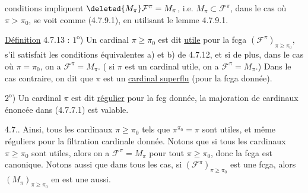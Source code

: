 conditions impliquent $\deleted{M_\pi}\mathcal F^\pi=M_\pi$, i.e. $M_\pi\subset\mathcal F^\pi$,
dans le cas où $\pi>\pi_0$, se voit comme (4.7.9.1),
en utilisant le lemme 4.7.9.1.

\uline{Définition} 4.7.13 : $1^{\mathrm{o}}$) Un cardinal $\pi\geq\pi_0$ est
dit  \uline{utile} pour la fcga $(\mathcal F^\pi)_{\pi\geq\pi_0}$, 
s'il satisfait les conditions équivalentes
a) et b) de 4.7.12, et si de plus, dans
le cas où $\pi=\pi_0$, on a  $\mathcal F^\pi=M_\pi$. (
si $\pi$ est un cardinal utile, on a   $\mathcal F^\pi=M_\pi$.)
Dans le cas contraire, on dit que $\pi$ est
un \uline{cardinal superflu} (pour la fcga
donnée).

$2^{\mathrm{o}}$) Un cardinal $\pi$ est dit \uline{régulier}
pour la fcg donnée,  
  la majoration de cardinaux énoncée dans
(4.7.7.1) est valable.

4.7.. Ainsi, tous les cardinaux $\pi\geq\pi_0$ tels que
$\pi^{\pi_0}=\pi$ sont utiles, et même réguliers pour
la filtration cardinale donnée. Notons
que si tous les cardinaux $\pi\geq\pi_0$ sont
utiles, alors on a $\mathcal F^\pi=M_\pi$ pour tout
$\pi\geq\pi_0$, donc la fcga est canonique. Notons
aussi que dans tous les cas, si $(\mathcal F^\pi)_{\pi\geq\pi_0}$ est
une fcga, alors $(M_\pi)_{\pi\geq\pi_0}$ en est une aussi.
